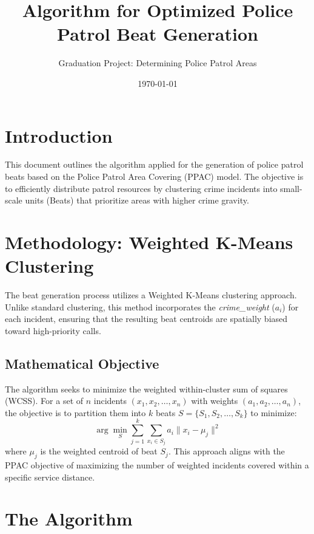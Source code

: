\documentclass[12pt]{article}
\title{Algorithm for Optimized Police Patrol Beat Generation}
\author{Graduation Project: Determining Police Patrol Areas}
\date{\today}
\begin{document}
\maketitle

\section{Introduction}
This document outlines the algorithm applied for the generation of police patrol beats based on the Police Patrol Area Covering (PPAC) model. The objective is to efficiently distribute patrol resources by clustering crime incidents into small-scale units (Beats) that prioritize areas with higher crime gravity.

\section{Methodology: Weighted K-Means Clustering}
The beat generation process utilizes a Weighted K-Means clustering approach. Unlike standard clustering, this method incorporates the \textit{crime\_weight} ($a_i$) for each incident, ensuring that the resulting beat centroids are spatially biased toward high-priority calls.

\subsection{Mathematical Objective}
The algorithm seeks to minimize the weighted within-cluster sum of squares (WCSS). For a set of $n$ incidents $(x_1, x_2, \dots, x_n)$ with weights $(a_1, a_2, \dots, a_n)$, the objective is to partition them into $k$ beats $S = \{S_1, S_2, \dots, S_k\}$ to minimize:
\begin{equation}
    \arg \min_{S} \sum_{j=1}^{k} \sum_{x_i \in S_j} a_i \| x_i - \mu_j \|^2
\end{equation}
where $\mu_j$ is the weighted centroid of beat $S_j$. This approach aligns with the PPAC objective of maximizing the number of weighted incidents covered within a specific service distance.

\section{The Algorithm}
\end{document}
